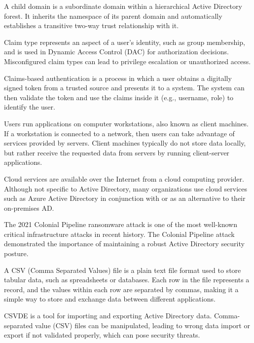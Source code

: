  A child domain is a subordinate domain within a hierarchical Active Directory forest. It inherits the namespace of its parent domain and automatically establishes a transitive two-way trust relationship with it.

 Claim type represents an aspect of a user’s identity, such as group membership, and is used in Dynamic Access Control (DAC) for authorization decisions. Misconfigured claim types can lead to privilege escalation or unauthorized access.

 Claims-based authentication is a process in which a user obtains a digitally signed token from a trusted source and presents it to a system. The system can then validate the token and use the claims inside it (e.g., username, role) to identify the user.

 Users run applications on computer workstations, also known as client machines. If a workstation is connected to a network, then users can take advantage of services provided by servers. Client machines typically do not store data locally, but rather receive the requested data from servers by running client-server applications.

 Cloud services are available over the Internet from a cloud computing provider. Although not specific to Active Directory, many organizations use cloud services such as Azure Active Directory in conjunction with or as an alternative to their on-premises AD.

 The 2021 Colonial Pipeline ransomware attack is one of the most well-known critical infrastructure attacks in recent history. The Colonial Pipeline attack demonstrated the importance of maintaining a robust Active Directory security posture.

 A CSV (Comma Separated Values) file is a plain text file format used to store tabular data, such as spreadsheets or databases. Each row in the file represents a record, and the values within each row are separated by commas, making it a simple way to store and exchange data between different applications. 

 CSVDE is a tool for importing and exporting Active Directory data. Comma-separated value (CSV) files can be manipulated, leading to wrong data import or export if not validated properly, which can pose security threats.

